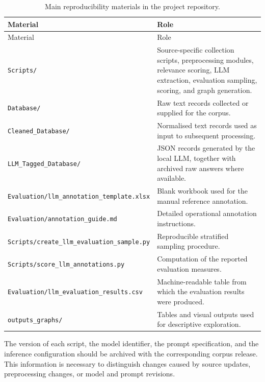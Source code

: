 \documentclass[
11pt,
english,
singlespacing,
headsepline,
]{MastersDoctoralThesis}
\begin{document}
\begin{longtable}{p{4.5cm}p{9.5cm}}
\caption{Main reproducibility materials in the project repository.}
\label{tab:appendix-materials}\\
\toprule
Material & Role \\
\midrule
\endfirsthead
\toprule
Material & Role \\
\midrule
\endhead
\bottomrule
\endfoot
\texttt{Scripts/} & Source-specific collection scripts, preprocessing modules, relevance scoring, LLM extraction, evaluation sampling, scoring, and graph generation. \\
\texttt{Database/} & Raw text records collected or supplied for the corpus. \\
\texttt{Cleaned\_Database/} & Normalised text records used as input to subsequent processing. \\
\texttt{LLM\_Tagged\_Database/} & JSON records generated by the local LLM, together with archived raw answers where available. \\
\texttt{Evaluation/llm\_annotation\_template.xlsx} & Blank workbook used for the manual reference annotation. \\
\texttt{Evaluation/annotation\_guide.md} & Detailed operational annotation instructions. \\
\texttt{Scripts/create\_llm\_evaluation\_sample.py} & Reproducible stratified sampling procedure. \\
\texttt{Scripts/score\_llm\_annotations.py} & Computation of the reported evaluation measures. \\
\texttt{Evaluation/llm\_evaluation\_results.csv} & Machine-readable table from which the evaluation results were produced. \\
\texttt{outputs\_graphs/} & Tables and visual outputs used for descriptive exploration. \\
\end{longtable}

The version of each script, the model identifier, the prompt specification, and
the inference configuration should be archived with the corresponding corpus
release. This information is necessary to distinguish changes caused by source
updates, preprocessing changes, or model and prompt revisions.





\end{document}
